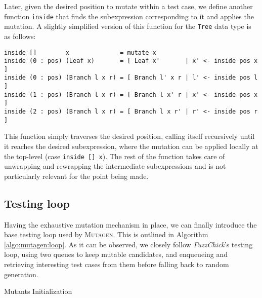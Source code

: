 \documentclass[sigconf, anonymous]{acmart}
\newcommand{\fuzzchick}{\textit{FuzzChick}\xspace}
\newcommand{\mutagen}{\textsc{Mutagen}\xspace}
\begin{document}
\noindent Later, given the desired position to mutate within a test case, we
define another function \texttt{inside} that finds the subexpression
corresponding to it and applies the mutation.
%
A slightly simplified version of this function for the \texttt{Tree} data type is
as follows:

\begin{verbatim}
inside []        x              = mutate x
inside (0 : pos) (Leaf x)       = [ Leaf x'       | x' <- inside pos x ]
inside (0 : pos) (Branch l x r) = [ Branch l' x r | l' <- inside pos l ]
inside (1 : pos) (Branch l x r) = [ Branch l x' r | x' <- inside pos x ]
inside (2 : pos) (Branch l x r) = [ Branch l x r' | r' <- inside pos r ]
\end{verbatim}

\noindent This function simply traverses the desired position, calling itself
recursively until it reaches the desired subexpression, where the mutation can
be applied locally at the top-level (case \texttt{inside [] x}).
%
The rest of the function takes care of unwrapping and rewrapping the
intermediate subexpressions and is not particularly relevant for the point being
made.


\subsection{Testing loop}

Having the exhaustive mutation mechanism in place, we can finally introduce the
base testing loop used by \mutagen.
%
This is outlined in Algorithm \ref{algo:mutagen:loop}.
%
As it can be observed, we closely follow \fuzzchick's testing loop, using two
queues to keep mutable candidates, and enqueueing and retrieving interesting
test cases from them before falling back to random generation.

\begin{algorithm}
  \SetInd{0em}{0.75em}
  \SetAlgoLined
  \DontPrintSemicolon
\caption{\label{algo:mutagen:init}Mutants Initialization}
\end{algorithm}
\end{document}
